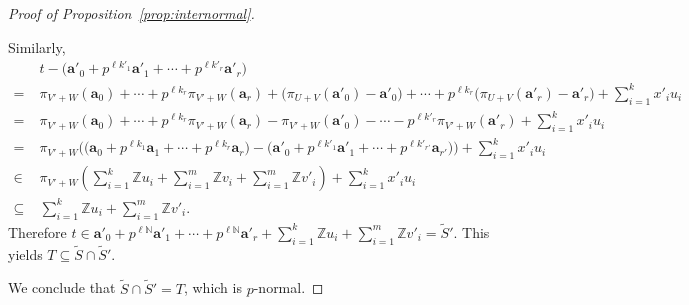 \documentclass[letterpaper, 11pt, thm-restate]{article}
\numberwithin{equation}{section}
\newcommand{\Z}{\mathbb{Z}}
\newcommand{\N}{\mathbb{N}}
\newcommand{\tS}{\widetilde{S}}
\newcommand{\ba}{\boldsymbol{a}}
\theoremstyle{definition}
\theoremstyle{definition}
\theoremstyle{definition}
\begin{document}
\begin{proof}[Proof of Proposition~\ref{prop:internormal}]
\begin{enumerate}[wide, label = \arabic*.]
    Similarly,
    \begin{align*}
        & t - \Big(\ba'_0 + p^{\ell k'_1} \ba'_1 + \cdots + p^{\ell k'_r} \ba'_r\Big) \\
        = \; & \pi_{V' + W}(\ba_0) + \cdots + p^{\ell k_r} \pi_{V' + W}(\ba_r) + \big(\pi_{U+V}(\ba'_0) - \ba'_0 \big) + \cdots + p^{\ell k_r} \big(\pi_{U+V}(\ba'_r) - \ba'_r \big) + \sum_{i = 1}^k x'_i u_i \\
        = \;& \pi_{V' + W}(\ba_0) + \cdots + p^{\ell k_r} \pi_{V' + W}(\ba_r) - \pi_{V' + W}(\ba'_0) - \cdots - p^{\ell k'_r} \pi_{V' + W}(\ba'_r) + \sum_{i = 1}^k x'_i u_i \\
        = \; & \pi_{V' + W} \Big( \big(\ba_0 + p^{\ell k_1} \ba_1 + \cdots + p^{\ell k_r} \ba_r\big) - \big(\ba'_0 + p^{\ell k'_1} \ba'_1 + \cdots + p^{\ell k'_{r'}} \ba_{r'}\big) \Big) + \sum_{i = 1}^k x'_i u_i \\
        \in \; & \pi_{V' + W} \left( \sum_{i = 1}^k \Z u_i + \sum_{i = 1}^m \Z v_i + \sum_{i = 1}^m \Z v'_i \right) + \sum_{i = 1}^k x'_i u_i \\
        \subseteq \; & \sum_{i = 1}^k \Z u_i + \sum_{i = 1}^m \Z v'_i.
    \end{align*}
    Therefore $t \in \ba'_0 + p^{\ell \N} \ba'_1 + \cdots + p^{\ell \N} \ba'_r + \sum_{i = 1}^k \Z u_i + \sum_{i = 1}^m \Z v'_i = \tS'$.
    This yields $T \subseteq \tS \cap \tS'$.
    \end{enumerate}
    We conclude that $\tS \cap \tS' = T$, which is $p$-normal.
\end{proof}
\end{document}
